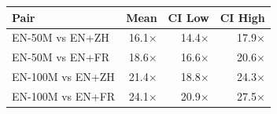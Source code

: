 \begin{tabular}{@{}lrrr@{}}
\toprule
Pair & Mean & CI Low & CI High \\
\midrule
EN-50M vs EN+ZH & 16.1$\times$ & 14.4$\times$ & 17.9$\times$ \\
EN-50M vs EN+FR & 18.6$\times$ & 16.6$\times$ & 20.6$\times$ \\
EN-100M vs EN+ZH & 21.4$\times$ & 18.8$\times$ & 24.3$\times$ \\
EN-100M vs EN+FR & 24.1$\times$ & 20.9$\times$ & 27.5$\times$ \\
\bottomrule
\end{tabular}
